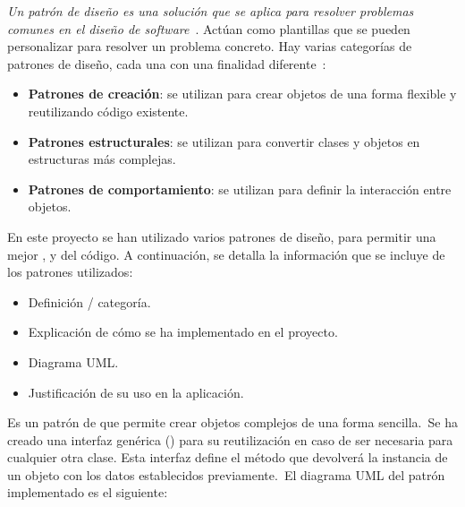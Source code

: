 
\textit{Un patrón de diseño es una solución que se aplica para resolver problemas comunes en el
diseño de software}~\cite{designPatternDefinition}.
Actúan como plantillas que se pueden personalizar para resolver un problema concreto.
Hay varias categorías de patrones de diseño, cada una con una finalidad diferente~\cite{designPatternClassification}:
\begin{itemize}
	\item \textbf{Patrones de creación}: se utilizan para crear objetos de una forma flexible y reutilizando código
	existente.
	\item \textbf{Patrones estructurales}: se utilizan para convertir clases y objetos en estructuras más complejas.
	\item \textbf{Patrones de comportamiento}: se utilizan para definir la interacción entre objetos.
\end{itemize}
\label{itm:categorias-patrones}

En este proyecto se han utilizado varios patrones de diseño, para permitir una mejor
,  y  del código.
A continuación, se detalla la información que se incluye de los patrones utilizados:
\begin{itemize}
	\item Definición / categoría.
	\item Explicación de cómo se ha implementado en el proyecto.
	\item Diagrama UML\@.
	\item Justificación de su uso en la aplicación.
\end{itemize}
\label{itm:uso-patrones}


Es un patrón de  que permite crear objetos complejos de una forma sencilla.\ Se ha creado una
interfaz genérica () para su reutilización en caso de ser necesaria para cualquier otra clase.
Esta interfaz define el método  que devolverá la instancia de un objeto con los datos establecidos
previamente.\ El diagrama UML del patrón implementado es el siguiente:

